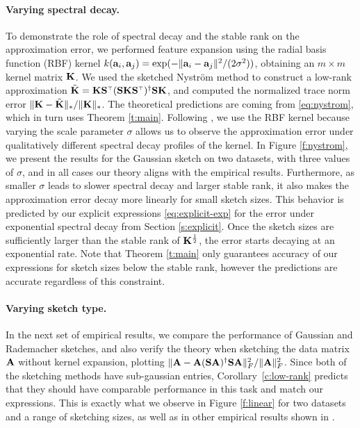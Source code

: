 \documentclass[../../thesis.tex]{subfiles}
\begin{document}
\paragraph{Varying spectral decay.}  To demonstrate the role of spectral
decay and the stable rank on the approximation error, we performed
feature expansion using the radial basis function (RBF) kernel
$k(\mathbf a_i,\mathbf a_j)=\exp(-\|\mathbf a_i-\mathbf a_j\|^2/(2\sigma^2))$, obtaining an $m\times m$
kernel matrix $\mathbf K$. We used the sketched Nystr\"om method to construct
a low-rank approximation $\tilde
  \K=\K\S^\top(\S\K\S^\top)^\dagger\S\K$, and computed the normalized trace norm
error $\|\mathbf K-\tilde{\mathbf K}\|_*/\|\mathbf K\|_*$. The theoretical predictions are coming from
\eqref{eq:nystrom}, which in turn uses Theorem \ref{t:main}.
Following \citep{revisiting-nystrom}, we use the RBF kernel because
varying the scale parameter $\sigma$
allows us to observe the approximation error under qualitatively
different spectral decay profiles of the kernel. In Figure \ref{f:nystrom},
we present the results for the Gaussian sketch on two datasets, with three values
of $\sigma$, and in all cases our theory aligns with the empirical
results. Furthermore, as smaller $\sigma$ leads to slower spectral decay and
larger stable rank, it also makes the approximation error decay more
linearly for small sketch sizes. This behavior is predicted by our explicit
expressions \eqref{eq:explicit-exp} for the error under exponential spectral decay from
Section \ref{s:explicit}. Once the sketch sizes are sufficiently
larger than the stable rank of $\mathbf K^{\frac12}$, the error starts decaying at an
exponential rate. Note that Theorem \ref{t:main} only guarantees
accuracy of our expressions for sketch sizes below the stable rank,
however the predictions are accurate regardless of this constraint.
\vspace{-2mm}
\paragraph{Varying sketch type.} In the next set of
empirical results, we compare the performance of Gaussian and Rademacher
sketches, and also verify the theory when sketching the data matrix $\mathbf A$
without kernel expansion, plotting
$\|\mathbf A-\mathbf A(\mathbf{S}\mathbf A)^\dagger\mathbf{S}\mathbf A\|_F^2/\|\mathbf A\|_F^2$.
Since both of the sketching methods have
sub-gaussian entries, Corollary~\ref{c:low-rank} predicts that they
should have comparable performance in this task and match our
expressions. This is exactly what we observe in Figure \ref{f:linear}
for two datasets and a range of sketching sizes, as well as in other
empirical results shown in .
\end{document}
